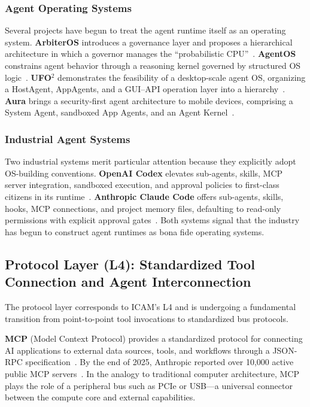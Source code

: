 \documentclass[11pt,a4paper]{article}
\begin{document}
\subsubsection{Agent Operating Systems}

Several projects have begun to treat the agent runtime itself as an operating system. \textbf{ArbiterOS} introduces a governance layer and proposes a hierarchical architecture in which a governor manages the ``probabilistic CPU''~\cite{arbiteros2025}. \textbf{AgentOS} constrains agent behavior through a reasoning kernel governed by structured OS logic~\cite{agentos2025}. \textbf{UFO$^2$} demonstrates the feasibility of a desktop-scale agent OS, organizing a HostAgent, AppAgents, and a GUI--API operation layer into a hierarchy~\cite{ufo2_2025}. \textbf{Aura} brings a security-first agent architecture to mobile devices, comprising a System Agent, sandboxed App Agents, and an Agent Kernel~\cite{aura2025}.

\subsubsection{Industrial Agent Systems}

Two industrial systems merit particular attention because they explicitly adopt OS-building conventions. \textbf{OpenAI Codex} elevates sub-agents, skills, MCP server integration, sandboxed execution, and approval policies to first-class citizens in its runtime~\cite{openai_codex_overview_2026,openai_codex_subagents_2026,openai_codex_skills_2026,openai_codex_sandbox_2026,openai_codex_approvals_2026}. \textbf{Anthropic Claude Code} offers sub-agents, skills, hooks, MCP connections, and project memory files, defaulting to read-only permissions with explicit approval gates~\cite{anthropic_claudecode_overview_2026,anthropic_claudecode_security_2026}. Both systems signal that the industry has begun to construct agent runtimes as bona fide operating systems.

\subsection{Protocol Layer (L4): Standardized Tool Connection and Agent Interconnection}
\label{sec:impl-protocol}

The protocol layer corresponds to ICAM's L4 and is undergoing a fundamental transition from point-to-point tool invocations to standardized bus protocols.

\textbf{MCP} (Model Context Protocol) provides a standardized protocol for connecting AI applications to external data sources, tools, and workflows through a JSON-RPC specification~\cite{mcp_intro_2026}. By the end of 2025, Anthropic reported over 10{,}000 active public MCP servers~\cite{mcpadoption2026}. In the analogy to traditional computer architecture, MCP plays the role of a peripheral bus such as PCIe or USB---a universal connector between the compute core and external capabilities.
\end{document}
